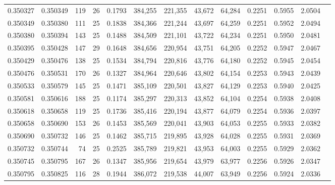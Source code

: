 \begin{tabular}{rrrrrrrrrrrrr}
0.350327 & 0.350349 &   119 &  26 &                                     0.1793 & 384,255 & 221,355 &  43,672 &  64,284 & 0.2251 & 0.5955 & 2.0504 \\
0.350349 & 0.350380 &   111 &  25 &                                     0.1838 & 384,366 & 221,244 &  43,697 &  64,259 & 0.2251 & 0.5952 & 2.0494 \\
0.350380 & 0.350394 &   143 &  25 &                                     0.1488 & 384,509 & 221,101 &  43,722 &  64,234 & 0.2251 & 0.5950 & 2.0481 \\
0.350395 & 0.350428 &   147 &  29 &                                     0.1648 & 384,656 & 220,954 &  43,751 &  64,205 & 0.2252 & 0.5947 & 2.0467 \\
0.350429 & 0.350476 &   138 &  25 &                                     0.1534 & 384,794 & 220,816 &  43,776 &  64,180 & 0.2252 & 0.5945 & 2.0454 \\
0.350476 & 0.350531 &   170 &  26 &                                     0.1327 & 384,964 & 220,646 &  43,802 &  64,154 & 0.2253 & 0.5943 & 2.0439 \\
0.350533 & 0.350579 &   145 &  25 &                                     0.1471 & 385,109 & 220,501 &  43,827 &  64,129 & 0.2253 & 0.5940 & 2.0425 \\
0.350581 & 0.350616 &   188 &  25 &                                     0.1174 & 385,297 & 220,313 &  43,852 &  64,104 & 0.2254 & 0.5938 & 2.0408 \\
0.350618 & 0.350658 &   119 &  25 &                                     0.1736 & 385,416 & 220,194 &  43,877 &  64,079 & 0.2254 & 0.5936 & 2.0397 \\
0.350658 & 0.350690 &   153 &  26 &                                     0.1453 & 385,569 & 220,041 &  43,903 &  64,053 & 0.2255 & 0.5933 & 2.0382 \\
0.350690 & 0.350732 &   146 &  25 &                                     0.1462 & 385,715 & 219,895 &  43,928 &  64,028 & 0.2255 & 0.5931 & 2.0369 \\
0.350732 & 0.350744 &    74 &  25 &                                     0.2525 & 385,789 & 219,821 &  43,953 &  64,003 & 0.2255 & 0.5929 & 2.0362 \\
0.350745 & 0.350795 &   167 &  26 &                                     0.1347 & 385,956 & 219,654 &  43,979 &  63,977 & 0.2256 & 0.5926 & 2.0347 \\
0.350795 & 0.350825 &   116 &  28 &                                     0.1944 & 386,072 & 219,538 &  44,007 &  63,949 & 0.2256 & 0.5924 & 2.0336 \\

\end{tabular}
